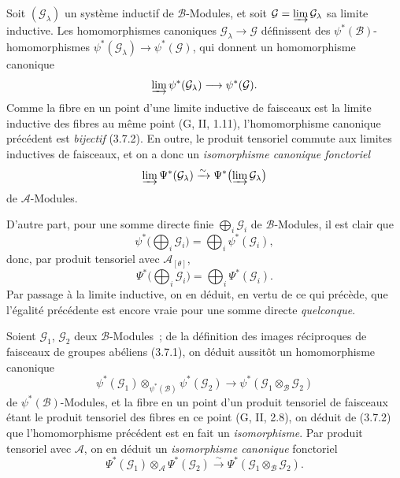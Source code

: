\begin{env}[4.3.2]
\label{0.4.3.2-fr}
Soit $(\mathcal{G}_\lambda)$ un système inductif de $\mathcal{B}$-Modules, et
soit $\mathcal{G}=\varinjlim\mathcal{G}_\lambda$ sa limite inductive. Les
homomorphismes canoniques $\mathcal{G}_\lambda\to\mathcal{G}$ définissent des
$\psi^*(\mathcal{B})$-homomorphismes
$\psi^*(\mathcal{G}_\lambda)\to\psi^*(\mathcal{G})$, qui donnent un
homomorphisme canonique
\[
  \varinjlim\psi^*(\mathcal{G}_\lambda)
  \longrightarrow
  \psi^*(\mathcal{G}).
\]
Comme la fibre en un point d'une limite inductive de faisceaux est la limite
inductive des fibres au même point (G, II, 1.11), l'homomorphisme canonique
précédent est \emph{bijectif} (3.7.2). En outre, le produit tensoriel commute
aux limites inductives de faisceaux, et on a donc un \emph{isomorphisme
canonique fonctoriel}
\[
  \varinjlim\Psi^*(\mathcal{G}_\lambda)
  \xrightarrow{\sim}
  \Psi^*\bigl(\varinjlim\mathcal{G}_\lambda\bigr)
\]
de $\mathcal{A}$-Modules.

D'autre part, pour une somme directe finie $\bigoplus_i\mathcal{G}_i$ de
$\mathcal{B}$-Modules, il est clair que
\[
  \psi^*\bigl(\bigoplus_i\mathcal{G}_i\bigr)
  =\bigoplus_i\psi^*(\mathcal{G}_i),
\]
donc, par produit tensoriel avec $\mathcal{A}_{[\theta]}$,
\[
  \Psi^*\bigl(\bigoplus_i\mathcal{G}_i\bigr)
  =\bigoplus_i\Psi^*(\mathcal{G}_i).
  \tag{4.3.2.1}\label{0.4.3.2.1-fr}
\]
Par passage à la limite inductive, on en déduit, en vertu de ce qui précède,
que l'égalité précédente est encore vraie pour une somme directe
\emph{quelconque}.
\end{env}

\begin{env}[4.3.3]
Soient $\mathcal{G}_1$, $\mathcal{G}_2$ deux $\mathcal{B}$-Modules~; de la
définition des images réciproques de faisceaux de groupes abéliens (3.7.1),
on déduit aussitôt un homomorphisme canonique
\[
  \psi^*(\mathcal{G}_1)\otimes_{\psi^*(\mathcal{B})}\psi^*(\mathcal{G}_2)
  \longrightarrow
  \psi^*(\mathcal{G}_1\otimes_{\mathcal{B}}\mathcal{G}_2)
\]
de $\psi^*(\mathcal{B})$-Modules, et la fibre en un point d'un produit
tensoriel de faisceaux étant le produit tensoriel des fibres en ce point
(G, II, 2.8), on déduit de (3.7.2) que l'homomorphisme précédent est en fait
un \emph{isomorphisme}. Par produit tensoriel avec $\mathcal{A}$, on en déduit
un \emph{isomorphisme canonique} fonctoriel
\[
  \Psi^*(\mathcal{G}_1)\otimes_{\mathcal{A}}\Psi^*(\mathcal{G}_2)
  \xrightarrow{\sim}
  \Psi^*(\mathcal{G}_1\otimes_{\mathcal{B}}\mathcal{G}_2).
  \tag{4.3.3.1}\label{0.4.3.3.1-fr}
\]
\end{env}

